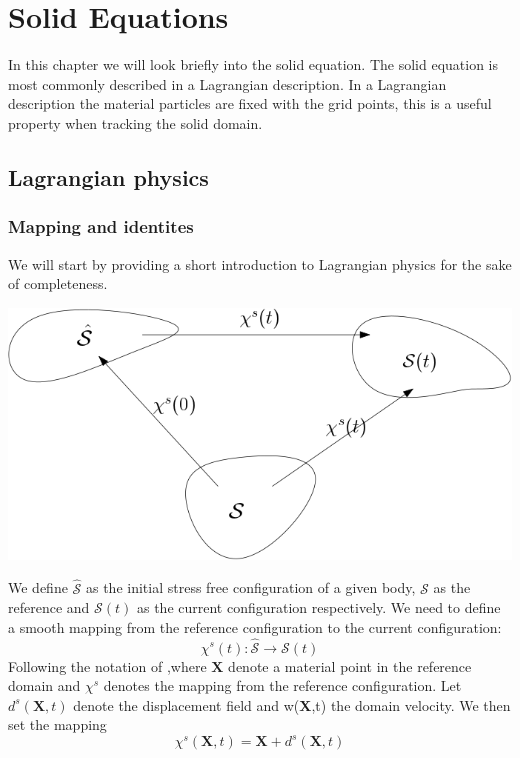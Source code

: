 \chapter*{Solid Equations}
In this chapter we will look briefly into the solid equation. The solid equation is most commonly described in a Lagrangian description. In a Lagrangian description the material particles are fixed with the grid points, this is a useful property when tracking the solid domain.

\section*{Lagrangian physics}
\subsection*{Mapping and identites}
We will start by providing a short introduction to Lagrangian physics for the sake of completeness.
\begin{center}
\includegraphics[scale=0.4]{continuum_mapping.png}
\end{center}
We define $ \hat{\mathcal{S}}$ as the initial stress free configuration of a given body, $\mathcal{S}$ as the reference and $\mathcal{S}(t)$ as the current configuration respectively.
We need to define a smooth mapping from the reference configuration to the current configuration:
\begin{equation}
\chi^s(t) : \hat{\mathcal{S}} \rightarrow \mathcal{S}(t)     
\end{equation}
Following the notation of \cite{Holzapfel2000},where $\textbf{X}$ denote a material point in the reference domain and $\chi^s$ denotes the mapping from the reference configuration. 
Let $d^s(\textbf{X},t)$ denote the displacement field and w(\textbf{X},t) the domain velocity. We then set the mapping
\begin{equation}
 \chi^s(\textbf{X},t) = \textbf{X}  + d^s(\textbf{X} ,t) 
\end{equation}

